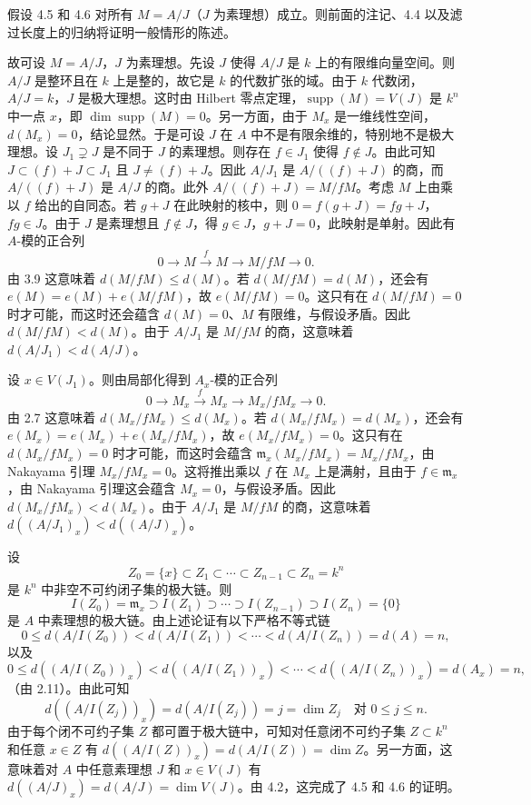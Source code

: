 假设 4.5 和 4.6 对所有 $M=A/J$（$J$ 为素理想）成立。则前面的注记、4.4 以及滤过长度上的归纳将证明一般情形的陈述。

故可设 $M=A/J$，$J$ 为素理想。先设 $J$ 使得 $A/J$ 是 $k$ 上的有限维向量空间。则 $A/J$ 是整环且在 $k$ 上是整的，故它是 $k$ 的代数扩张的域。由于 $k$ 代数闭，$A/J=k$，$J$ 是极大理想。这时由 Hilbert 零点定理，$\operatorname{supp}(M)=V(J)$ 是 $k^n$ 中一点 $x$，即 $\dim\operatorname{supp}(M)=0$。另一方面，由于 $M_x$ 是一维线性空间，$d(M_x)=0$，结论显然。于是可设 $J$ 在 $A$ 中不是有限余维的，特别地不是极大理想。设 $J_1\supsetneq J$ 是不同于 $J$ 的素理想。则存在 $f\in J_1$ 使得 $f\notin J$。由此可知 $J\subset (f)+J\subset J_1$ 且 $J\neq(f)+J$。因此 $A/J_1$ 是 $A/((f)+J)$ 的商，而 $A/((f)+J)$ 是 $A/J$ 的商。此外 $A/((f)+J)=M/fM$。考虑 $M$ 上由乘以 $f$ 给出的自同态。若 $g+J$ 在此映射的核中，则 $0=f(g+J)=fg+J$，$fg\in J$。由于 $J$ 是素理想且 $f\notin J$，得 $g\in J$，$g+J=0$，此映射是单射。因此有 $A$-模的正合列
$$0\longrightarrow M\xrightarrow{\ f\ }M\longrightarrow M/fM\longrightarrow 0.$$
由 3.9 这意味着 $d(M/fM)\le d(M)$。若 $d(M/fM)=d(M)$，还会有 $e(M)=e(M)+e(M/fM)$，故 $e(M/fM)=0$。这只有在 $d(M/fM)=0$ 时才可能，而这时还会蕴含 $d(M)=0$、$M$ 有限维，与假设矛盾。因此 $d(M/fM)<d(M)$。由于 $A/J_1$ 是 $M/fM$ 的商，这意味着 $d(A/J_1)<d(A/J)$。

设 $x\in V(J_1)$。则由局部化得到 $A_x$-模的正合列
$$0\longrightarrow M_x\xrightarrow{\ f\ }M_x\longrightarrow M_x/fM_x\longrightarrow 0.$$
由 2.7 这意味着 $d(M_x/fM_x)\le d(M_x)$。若 $d(M_x/fM_x)=d(M_x)$，还会有 $e(M_x)=e(M_x)+e(M_x/fM_x)$，故 $e(M_x/fM_x)=0$。这只有在 $d(M_x/fM_x)=0$ 时才可能，而这时会蕴含 $\mathfrak{m}_x(M_x/fM_x)=M_x/fM_x$，由 Nakayama 引理 $M_x/fM_x=0$。这将推出乘以 $f$ 在 $M_x$ 上是满射，且由于 $f\in\mathfrak{m}_x$，由 Nakayama 引理这会蕴含 $M_x=0$，与假设矛盾。因此 $d(M_x/fM_x)<d(M_x)$。由于 $A/J_1$ 是 $M/fM$ 的商，这意味着 $d((A/J_1)_x)<d((A/J)_x)$。

设
$$Z_0=\{x\}\subset Z_1\subset\cdots\subset Z_{n-1}\subset Z_n=k^n$$
是 $k^n$ 中非空不可约闭子集的极大链。则
$$I(Z_0)=\mathfrak{m}_x\supset I(Z_1)\supset\cdots\supset I(Z_{n-1})\supset I(Z_n)=\{0\}$$
是 $A$ 中素理想的极大链。由上述论证有以下严格不等式链
$$0\le d(A/I(Z_0))<d(A/I(Z_1))<\cdots<d(A/I(Z_n))=d(A)=n,$$
以及
$$0\le d((A/I(Z_0))_x)<d((A/I(Z_1))_x)<\cdots<d((A/I(Z_n))_x)=d(A_x)=n,$$
（由 2.11）。由此可知
$$d((A/I(Z_j))_x)=d(A/I(Z_j))=j=\dim Z_j\quad\text{对 }0\le j\le n.$$
由于每个闭不可约子集 $Z$ 都可置于极大链中，可知对任意闭不可约子集 $Z\subset k^n$ 和任意 $x\in Z$ 有 $d((A/I(Z))_x)=d(A/I(Z))=\dim Z$。另一方面，这意味着对 $A$ 中任意素理想 $J$ 和 $x\in V(J)$ 有 $d((A/J)_x)=d(A/J)=\dim V(J)$。由 4.2，这完成了 4.5 和 4.6 的证明。

